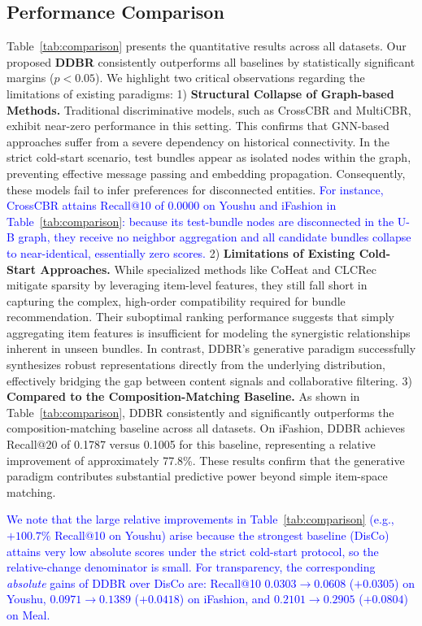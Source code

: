 \documentclass[lettersize,journal]{IEEEtran}
\newcommand{\revise}[1]{\textcolor{blue}{#1}}
\begin{document}
\subsection{Performance Comparison}
Table~\ref{tab:comparison} presents the quantitative results across all datasets. Our proposed \textbf{DDBR} consistently outperforms all baselines by statistically significant margins ($p < 0.05$). We highlight two critical observations regarding the limitations of existing paradigms: 1) \textbf{Structural Collapse of Graph-based Methods.} Traditional discriminative models, such as CrossCBR and MultiCBR, exhibit near-zero performance in this setting. This confirms that GNN-based approaches suffer from a severe dependency on historical connectivity. In the strict cold-start scenario, test bundles appear as isolated nodes within the graph, preventing effective message passing and embedding propagation. Consequently, these models fail to infer preferences for disconnected entities. \revise{For instance, CrossCBR attains Recall@10 of $0.0000$ on Youshu and iFashion in Table~\ref{tab:comparison}: because its test-bundle nodes are disconnected in the U-B graph, they receive no neighbor aggregation and all candidate bundles collapse to near-identical, essentially zero scores.}
2) \textbf{Limitations of Existing Cold-Start Approaches.}
While specialized methods like CoHeat and CLCRec mitigate sparsity by leveraging item-level features, they still fall short in capturing the complex, high-order compatibility required for bundle recommendation. Their suboptimal ranking performance suggests that simply aggregating item features is insufficient for modeling the synergistic relationships inherent in unseen bundles. In contrast, DDBR's generative paradigm successfully synthesizes robust representations directly from the underlying distribution, effectively bridging the gap between content signals and collaborative filtering.
3) \textbf{Compared to the Composition-Matching Baseline.}
As shown in Table~\ref{tab:comparison}, DDBR consistently and significantly outperforms the composition-matching baseline across all datasets. On iFashion, DDBR achieves Recall@20 of 0.1787 versus 0.1005 for this baseline, representing a relative improvement of approximately 77.8\%. These results confirm that the generative paradigm contributes substantial predictive power beyond simple item-space matching.

\revise{We note that the large relative improvements in Table~\ref{tab:comparison} (e.g., $+100.7\%$ Recall@10 on Youshu) arise because the strongest baseline (DisCo) attains very low absolute scores under the strict cold-start protocol, so the relative-change denominator is small. For transparency, the corresponding \emph{absolute} gains of DDBR over DisCo are: Recall@10 $0.0303{\to}0.0608$ ($+0.0305$) on Youshu, $0.0971{\to}0.1389$ ($+0.0418$) on iFashion, and $0.2101{\to}0.2905$ ($+0.0804$) on Meal.}
\end{document}
